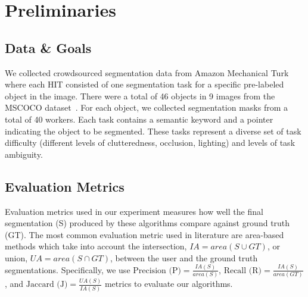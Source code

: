 \section{Preliminaries}
\subsection{Data \& Goals}
We collected crowdsourced segmentation data from Amazon Mechanical Turk where each HIT consisted of one segmentation task for a specific pre-labeled object in the image. There were a total of 46 objects in 9 images from the MSCOCO dataset~\cite{Lin2014}. For each object, we collected segmentation masks from a total of 40 workers. Each task contains a semantic keyword and a pointer indicating the object to be segmented. These tasks represent a diverse set of task difficulty (different levels of clutteredness, occlusion, lighting) and levels of task ambiguity. %
\subsection{Evaluation Metrics}
\par Evaluation metrics used in our experiment measures how well the final segmentation (S) produced by these algorithms compare against ground truth (GT). The most common evaluation metric used in literature are area-based methods which take into account the intersection, $IA=area(S\cup GT)$, or union, $UA=area(S\cap GT)$, between the user and the ground truth segmentations. Specifically, we use
    $\text{Precision (P)} = \frac{IA(S)}{area(S)}$, 
    $\text{Recall (R)} = \frac{IA(S)}{area(GT)}$, and 
    $\text{Jaccard (J)} = \frac{UA(S)}{IA(S)}$
    metrics to evaluate our algorithms.

